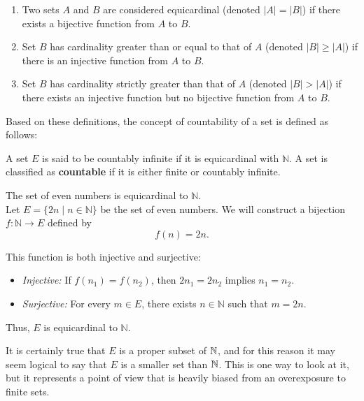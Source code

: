 \begin{definition}
    \begin{enumerate}
        \item Two sets \(A\) and \(B\) are considered equicardinal (denoted \(|A| = |B|\)) if there exists a bijective function from \(A\) to \(B\).
        \item Set \(B\) has cardinality greater than or equal to that of \(A\) (denoted \(|B| \geq |A|\)) if there is an injective function from \(A\) to \(B\).
        \item Set \(B\) has cardinality strictly greater than that of \(A\) (denoted \(|B| > |A|\)) if there exists an injective function but no bijective function from \(A\) to \(B\).
    \end{enumerate}
\end{definition}

Based on these definitions, the concept of countability of a set is defined as follows:

\begin{definition}
    A set \(E\) is said to be countably infinite if it is equicardinal with \(\mathbb{N}\). A set is classified as \textbf{countable} if it is either finite or countably infinite. \\
\end{definition}


\begin{example}
    The set of even numbers is equicardinal to $\mathbb{N}$. \\

    Let \( E = \{ 2n \mid n \in \mathbb{N} \} \) be the set of even numbers. We will construct a bijection \( f: \mathbb{N} \to E \) defined by
\[
f(n) = 2n.
\]

This function is both injective and surjective: 

\begin{itemize}
    \item \textit{Injective:} If \( f(n_1) = f(n_2) \), then \( 2n_1 = 2n_2 \) implies \( n_1 = n_2 \).
    \item \textit{Surjective:} For every \( m \in E \), there exists \( n \in \mathbb{N} \) such that \( m = 2n \).
\end{itemize}

Thus, \( E \) is equicardinal to \( \mathbb{N} \).
\end{example}

It is certainly true that $E$ is a proper subset of $\mathbb{N}$, and for this reason it may seem logical to say that $E$ is a smaller set than $\mathbb{N}$. This is one way to look at it, but it represents a point of view that is heavily biased from an overexposure to finite sets.


